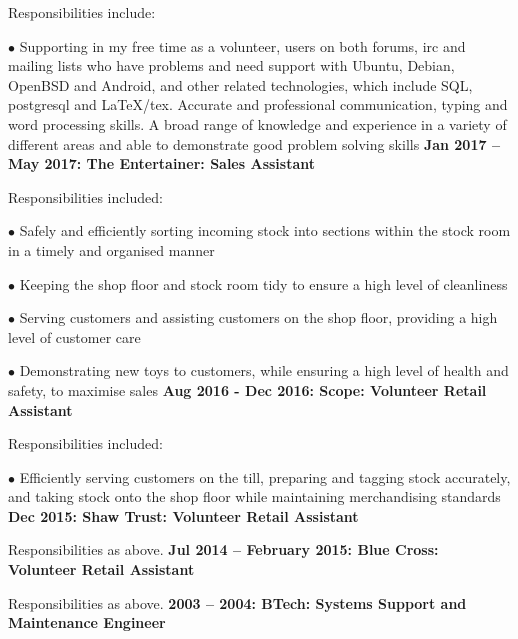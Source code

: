 \documentclass[10pt,a4paper]{book}
\begin{document}
\begin{flushleft}
Responsibilities include:

  \item[$\bullet$]Supporting in my free time as a volunteer, users on both forums, irc and mailing lists who have problems and need support with Ubuntu, Debian, OpenBSD and Android, and other related technologies, which include SQL, postgresql and LaTeX/tex. Accurate and professional communication, typing and word processing skills. A broad range of knowledge and experience in a variety of different areas and able to demonstrate good problem solving skills
    \linebreak{}
    \linebreak{}
\textbf {Jan 2017 -- May 2017: The Entertainer: Sales Assistant}
  
Responsibilities included:

  \item[$\bullet$]Safely and efficiently sorting incoming stock into sections within the stock room in a timely and organised manner

  \item[$\bullet$]Keeping the shop floor and stock room tidy to ensure a high level of cleanliness

  \item[$\bullet$]Serving customers and assisting customers on the shop floor, providing a high level of customer care

  \item[$\bullet$]Demonstrating new toys to customers, while ensuring a high level of health and safety, to maximise sales
    \linebreak{}
    \linebreak{}
  \textbf {Aug 2016 - Dec 2016: Scope: Volunteer Retail Assistant}

Responsibilities included:

  \item[$\bullet$]Efficiently serving customers on the till, preparing and tagging stock accurately, and taking stock onto the shop floor while maintaining merchandising standards
    \linebreak{}
    \linebreak{}
  \textbf {Dec 2015: Shaw Trust: Volunteer Retail Assistant}

Responsibilities as above.
\linebreak{}
\linebreak{}
  \textbf {Jul 2014 -- February 2015: Blue Cross: Volunteer Retail Assistant}

Responsibilities as above.
\linebreak{}
\linebreak{}
\textbf {2003 -- 2004: BTech: Systems Support and Maintenance Engineer}
  

\end{flushleft}
\end{document}
